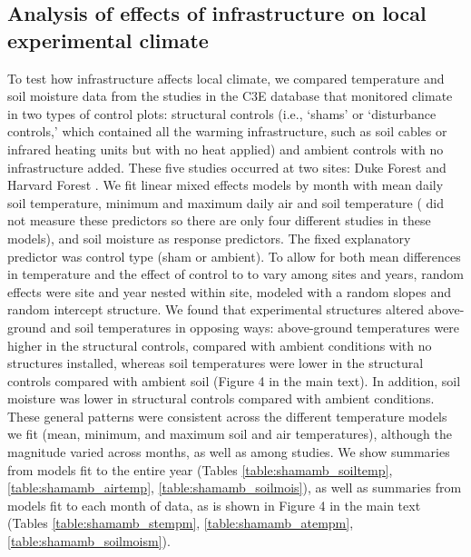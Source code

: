 \documentclass{article}
\begin{document}
\subsection* {Analysis of effects of infrastructure on local experimental climate}
To test how infrastructure affects local climate, we compared temperature and soil moisture data from the studies in the C3E database that monitored climate in two types of control plots: structural controls (i.e., `shams' or `disturbance controls,'
which contained all the warming infrastructure, such as soil cables or infrared heating units but with no heat
applied) and ambient controls with no infrastructure added. These five studies occurred at two sites: Duke Forest and Harvard Forest \citep{farnsworth1995,clark2014a,marchin2015,pelini2011}. We fit linear mixed effects models by month with mean daily soil temperature, minimum and maximum daily air and soil temperature (\citet{farnsworth1995} did not measure these predictors so there are only four different studies in these models), and soil moisture as response predictors. The fixed explanatory predictor was control type (sham or ambient). To allow for both mean differences in temperature and the effect of control to to vary among sites and years, random effects were site and year nested within site, modeled with a random slopes and random intercept structure. 
We found that experimental structures altered above-ground and soil temperatures in opposing ways: above-ground
temperatures were higher in the structural controls, compared with ambient conditions with no
structures installed, whereas soil temperatures were lower in the structural controls compared with ambient
soil (Figure 4 in the main text).  In addition, soil moisture was lower in
structural controls compared with ambient conditions. These general patterns were consistent across the different temperature models we fit (mean,
minimum, and maximum soil and air temperatures), although the magnitude varied across months, as well
as among studies. We show summaries from models fit to the entire year (Tables \ref{table:shamamb_soiltemp}, \ref{table:shamamb_airtemp}, \ref{table:shamamb_soilmois}), as well as summaries from models fit to each month of data, as is shown in Figure 4 in the main text (Tables \ref{table:shamamb_stempm}, \ref{table:shamamb_atempm}, \ref{table:shamamb_soilmoism}).
\end{document}
